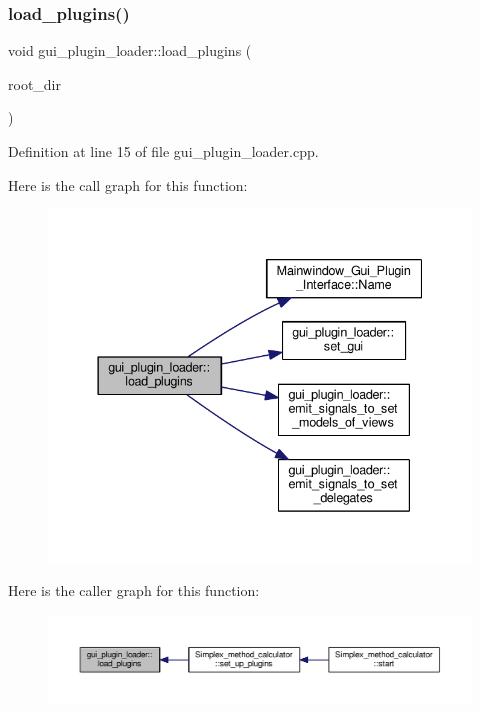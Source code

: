 \subsubsection{\texorpdfstring{load\+\_\+plugins()}{load\_plugins()}}
{\footnotesize\ttfamily void gui\+\_\+plugin\+\_\+loader\+::load\+\_\+plugins (\begin{DoxyParamCaption}\item[{Q\+Dir}]{root\+\_\+dir }\end{DoxyParamCaption})}



Definition at line 15 of file gui\+\_\+plugin\+\_\+loader.\+cpp.

Here is the call graph for this function\+:\nopagebreak
\begin{figure}[H]
\begin{center}
\leavevmode
\includegraphics[width=337pt]{classgui__plugin__loader_afaea2c8da605ce9ee8e2995449a67eda_cgraph}
\end{center}
\end{figure}
Here is the caller graph for this function\+:\nopagebreak
\begin{figure}[H]
\begin{center}
\leavevmode
\includegraphics[width=350pt]{classgui__plugin__loader_afaea2c8da605ce9ee8e2995449a67eda_icgraph}
\end{center}
\end{figure}
\mbox{\label{classgui__plugin__loader_a0d2c0ab3d2eefbc2b6dcc246ea58d43b}} 
